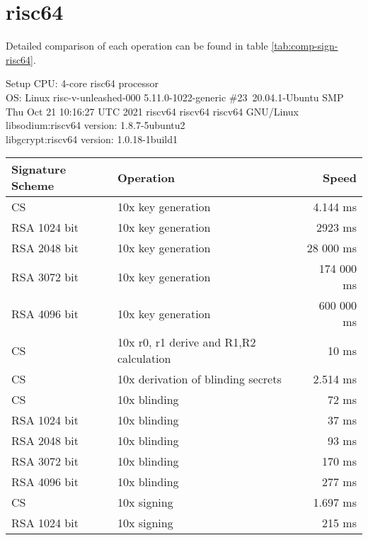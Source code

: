 \section{risc64}
Detailed comparison of each operation can be found in table \ref{tab:comp-sign-risc64}.
\begin{bfhBox}{Setup}
	CPU:  4-core risc64 processor\\
    OS: Linux risc-v-unleashed-000 5.11.0-1022-generic \#23~20.04.1-Ubuntu SMP Thu Oct 21 10:16:27 UTC 2021 riscv64 riscv64 riscv64 GNU/Linux\\
    libsodium:riscv64 version: 1.8.7-5ubuntu2  \\ 
    libgcrypt:riscv64 version: 1.0.18-1build1
\end{bfhBox}

\begin{table}[ht]
    \centering
    \setupBfhTabular
    \begin{tabular}{llr}
        \rowcolor{BFH-tablehead}
        \textbf{Signature Scheme} & \textbf{Operation} & \textbf{Speed} \\\hline
        CS & 10x key generation & 4.144 ms \\\hline
        RSA 1024 bit & 10x key generation & 2923 ms \\\hline
        RSA 2048 bit & 10x key generation & 28 000 ms \\\hline
        RSA 3072 bit & 10x key generation & 174 000 ms \\\hline
        RSA 4096 bit & 10x key generation & 600 000 ms \\\hline
        \hline
        CS & 10x r0, r1 derive and R1,R2 calculation & 10 ms \\\hline
        CS & 10x derivation of blinding secrets & 2.514 ms \\\hline
        CS & 10x blinding & 72 ms \\\hline
        RSA 1024 bit & 10x blinding & 37 ms \\\hline
        RSA 2048 bit & 10x blinding & 93 ms \\\hline
        RSA 3072 bit & 10x blinding & 170 ms \\\hline
        RSA 4096 bit & 10x blinding & 277 ms \\\hline
        \hline
        CS & 10x signing & 1.697 ms \\\hline
        RSA 1024 bit & 10x signing & 215 ms \\\hline

\end{tabular}
\end{table}
